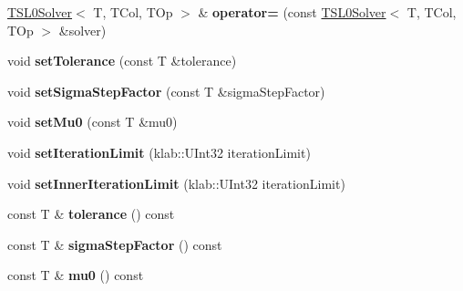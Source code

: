 \begin{DoxyCompactItemize}
\item 
\hyperlink{classkl1p_1_1TSL0Solver}{T\+S\+L0\+Solver}$<$ T, T\+Col, T\+Op $>$ \& {\bfseries operator=} (const \hyperlink{classkl1p_1_1TSL0Solver}{T\+S\+L0\+Solver}$<$ T, T\+Col, T\+Op $>$ \&solver)\hypertarget{classkl1p_1_1TSL0Solver_a99b49bec6cb34051aa7f090b21b57218}{}\label{classkl1p_1_1TSL0Solver_a99b49bec6cb34051aa7f090b21b57218}

\item 
void {\bfseries set\+Tolerance} (const T \&tolerance)\hypertarget{classkl1p_1_1TSL0Solver_aca386fcd530dd63e441713b946ebe91a}{}\label{classkl1p_1_1TSL0Solver_aca386fcd530dd63e441713b946ebe91a}

\item 
void {\bfseries set\+Sigma\+Step\+Factor} (const T \&sigma\+Step\+Factor)\hypertarget{classkl1p_1_1TSL0Solver_a3fc507ee8a9e107e6baac4f72c14efa6}{}\label{classkl1p_1_1TSL0Solver_a3fc507ee8a9e107e6baac4f72c14efa6}

\item 
void {\bfseries set\+Mu0} (const T \&mu0)\hypertarget{classkl1p_1_1TSL0Solver_a18d8db7455c0365b8a5b6cbf7d0381b4}{}\label{classkl1p_1_1TSL0Solver_a18d8db7455c0365b8a5b6cbf7d0381b4}

\item 
void {\bfseries set\+Iteration\+Limit} (klab\+::\+U\+Int32 iteration\+Limit)\hypertarget{classkl1p_1_1TSL0Solver_a03ed46f4140d706ec6671fca9c59f4bd}{}\label{classkl1p_1_1TSL0Solver_a03ed46f4140d706ec6671fca9c59f4bd}

\item 
void {\bfseries set\+Inner\+Iteration\+Limit} (klab\+::\+U\+Int32 iteration\+Limit)\hypertarget{classkl1p_1_1TSL0Solver_ac8ee11e6d6db2e527450e785e0c8a775}{}\label{classkl1p_1_1TSL0Solver_ac8ee11e6d6db2e527450e785e0c8a775}

\item 
const T \& {\bfseries tolerance} () const \hypertarget{classkl1p_1_1TSL0Solver_ace5c75364dd16fe6dd7fb0230a909328}{}\label{classkl1p_1_1TSL0Solver_ace5c75364dd16fe6dd7fb0230a909328}

\item 
const T \& {\bfseries sigma\+Step\+Factor} () const \hypertarget{classkl1p_1_1TSL0Solver_a7d0e68259f8e09063e5cfb106de3ae33}{}\label{classkl1p_1_1TSL0Solver_a7d0e68259f8e09063e5cfb106de3ae33}

\item 
const T \& {\bfseries mu0} () const \hypertarget{classkl1p_1_1TSL0Solver_a168a2a7f64a43e8ce4d3204fb286aa2a}{}\label{classkl1p_1_1TSL0Solver_a168a2a7f64a43e8ce4d3204fb286aa2a}


\end{DoxyCompactItemize}
